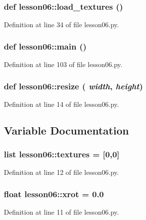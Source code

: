 \subsubsection{\setlength{\rightskip}{0pt plus 5cm}def lesson06::load\_\-textures ()}\label{namespacelesson06_e48ff65b3ab0c94d9db56777783069f0}




Definition at line 34 of file lesson06.py.
\subsubsection{\setlength{\rightskip}{0pt plus 5cm}def lesson06::main ()}\label{namespacelesson06_a9c17bf7525396844356dcd75e3faf8a}




Definition at line 103 of file lesson06.py.
\subsubsection{\setlength{\rightskip}{0pt plus 5cm}def lesson06::resize ( {\em width},  {\em height})}\label{namespacelesson06_76f12a0d0b9fa7aadf399b8c19a7f537}




Definition at line 14 of file lesson06.py.

\subsection{Variable Documentation}
\subsubsection{\setlength{\rightskip}{0pt plus 5cm}list {\bf lesson06::textures} = [0,0]\hspace{0.3cm}{\tt  [static]}}\label{namespacelesson06_9dc05229a71bcb5591e0579d89838030}




Definition at line 12 of file lesson06.py.
\subsubsection{\setlength{\rightskip}{0pt plus 5cm}float {\bf lesson06::xrot} = 0.0\hspace{0.3cm}{\tt  [static]}}\label{namespacelesson06_7e84bd7db80854715975e6ee7429fd87}




Definition at line 11 of file lesson06.py.